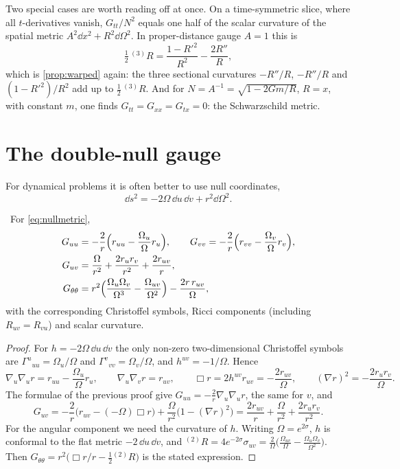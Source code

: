 Two special cases are worth reading off at once. On a time-symmetric slice, where all $t$-derivatives vanish, $G_{tt}/N^2$ equals one half of the scalar curvature of the spatial metric $A^2\dd x^2+R^2\dd\Omega^2$. In proper-distance gauge $A=1$ this is
\begin{equation}\label{eq:3R}
\tfrac12\,{}^{(3)}R=\frac{1-R'^2}{R^2}-\frac{2R''}{R},
\end{equation}
which is \cref{prop:warped} again: the three sectional curvatures $-R''/R$, $-R''/R$ and $(1-R'^2)/R^2$ add up to $\frac12\,{}^{(3)}R$. And for $N=A^{-1}=\sqrt{1-2Gm/R}$, $R=x$, with constant $m$, one finds $G_{tt}=G_{xx}=G_{tx}=0$: the Schwarzschild metric.

\section{The double-null gauge}

For dynamical problems it is often better to use null coordinates,
\begin{equation}\label{eq:nullmetric}
\dd s^2=-2\Omega\,\dd u\,\dd v+r^2\dd\Omega^2 .
\end{equation}

\begin{theorem}\label{thm:einN}\ver\
For \eqref{eq:nullmetric},
\begin{align*}
G_{uu}&=-\frac2r\Bigl(r_{uu}-\frac{\Omega_u}{\Omega}r_u\Bigr),\qquad
G_{vv}=-\frac2r\Bigl(r_{vv}-\frac{\Omega_v}{\Omega}r_v\Bigr),\\
G_{uv}&=\frac{\Omega}{r^2}+\frac{2r_ur_v}{r^2}+\frac{2r_{uv}}{r},\\
G_{\theta\theta}&=r^2\Bigl(\frac{\Omega_u\Omega_v}{\Omega^3}-\frac{\Omega_{uv}}{\Omega^2}\Bigr)-\frac{2r\,r_{uv}}{\Omega},
\end{align*}
with the corresponding Christoffel symbols, Ricci components (including $R_{uv}=R_{vu}$) and scalar curvature.
\end{theorem}
\begin{proof}
For $h=-2\Omega\,\dd u\,\dd v$ the only non-zero two-dimensional Christoffel symbols are $\Gamma^u{}_{uu}=\Omega_u/\Omega$ and $\Gamma^v{}_{vv}=\Omega_v/\Omega$, and $h^{uv}=-1/\Omega$. Hence
\[
\nabla_u\nabla_ur=r_{uu}-\frac{\Omega_u}\Omega r_u,\qquad \nabla_u\nabla_vr=r_{uv},\qquad \Box r=2h^{uv}r_{uv}=-\frac{2r_{uv}}\Omega,\qquad (\nabla r)^2=-\frac{2r_ur_v}\Omega .
\]
The formulae of the previous proof give $G_{uu}=-\frac2r\nabla_u\nabla_ur$, the same for $v$, and
\[
G_{uv}=-\frac2r\bigl(r_{uv}-(-\Omega)\Box r\bigr)+\frac\Omega{r^2}\bigl(1-(\nabla r)^2\bigr)=\frac{2r_{uv}}r+\frac\Omega{r^2}+\frac{2r_ur_v}{r^2}.
\]
For the angular component we need the curvature of $h$. Writing $\Omega=e^{2\sigma}$, $h$ is conformal to the flat metric $-2\,\dd u\,\dd v$, and ${}^{(2)}\!R=4e^{-2\sigma}\sigma_{uv}=\frac2\Omega\bigl(\frac{\Omega_{uv}}\Omega-\frac{\Omega_u\Omega_v}{\Omega^2}\bigr)$. Then $G_{\theta\theta}=r^2\bigl(\Box r/r-\frac12{}^{(2)}\!R\bigr)$ is the stated expression.
\end{proof}


